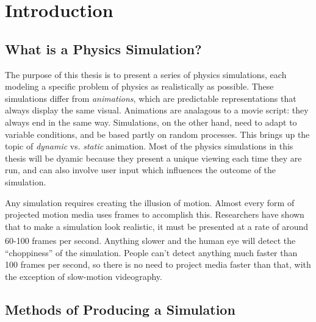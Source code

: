 
\chapter*{Introduction}
\label{intro} %



\section{What is a Physics Simulation?}

\hspace{.5cm} The purpose of this thesis is to present a series of physics simulations, each modeling a specific problem of physics as realistically as possible.  These simulations differ from \textit{animations}, which are predictable representations that always display the same visual.  Animations are analagous to a movie script: they always end in the same way.  Simulations, on the other hand, need to adapt to variable conditions, and be based partly on random processes.  This brings up the topic of \textit{dynamic} vs. \textit{static} animation.  Most of the physics simulations in this thesis will be dyamic because they present a unique viewing each time they are run, and can also involve user input which influences the outcome of the simulation.

Any simulation requires creating the illusion of motion.  Almost every form of projected motion media uses frames to accomplish this.  Researchers have shown that to make a simulation look realistic, it must be presented at a rate of around 60-100 frames per second.\textsuperscript{\cite{jsbook}}  Anything slower and the human eye will detect the ``choppiness'' of the simulation.  People can't detect anything much faster than 100 frames per second, so there is no need to project media faster than that, with the exception of slow-motion videography.  






\section{Methods of Producing a Simulation}

